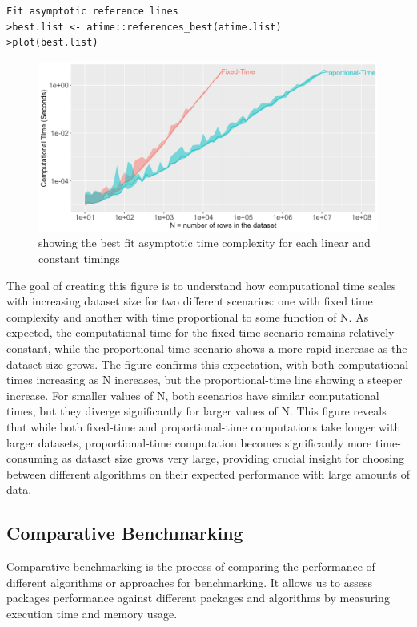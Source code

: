 \begin{lstlisting}
Fit asymptotic reference lines
>best.list <- atime::references_best(atime.list)
>plot(best.list)
\end{lstlisting}
\vspace{0.1in}

\begin{figure}[H]
    \centering
    \includegraphics[width=0.8\linewidth]{figures/best.list.R.png}
    \caption{showing the best fit asymptotic time complexity for each linear and constant timings}
    \label{fig:label1}
\end{figure}

\noindent The goal of creating this figure is to understand how computational time scales with increasing dataset size for two different scenarios: one with fixed time complexity and another with time proportional to some function of N. As expected, the computational time for the fixed-time scenario remains relatively constant, while the proportional-time scenario shows a more rapid increase as the dataset size grows. The figure confirms this expectation, with both computational times increasing as N increases, but the proportional-time line showing a steeper increase. For smaller values of N, both scenarios have similar computational times, but they diverge significantly for larger values of N. This figure reveals that while both fixed-time and proportional-time computations take longer with larger datasets, proportional-time computation becomes significantly more time-consuming as dataset size grows very large, providing crucial insight for choosing between different algorithms on their expected performance with large amounts of data.\\

\subsection{Comparative Benchmarking}

\noindent Comparative benchmarking is the process of comparing the performance of different algorithms or approaches for benchmarking. It allows us to assess packages performance against different packages and algorithms by measuring execution time and memory usage.\\

